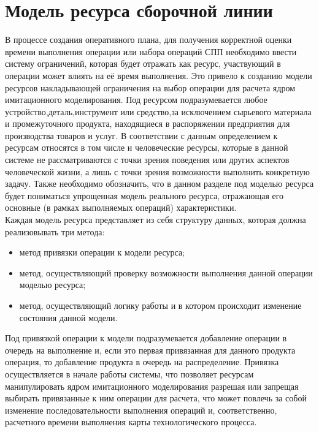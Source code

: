 \section{Модель ресурса сборочной линии}
\indent В процессе создания оперативного плана, для получения корректной оценки времени выполнения операции или набора операций СПП необходимо ввести систему ограничений, которая будет отражать как ресурс, участвующий в операции может влиять на её время выполнения.
Это привело к созданию модели ресурсов накладывающей ограничения на выбор операции для расчета ядром имитационного моделирования.
Под ресурсом подразумевается любое устройство,деталь,инструмент или средство,за исключением сырьевого материала и промежуточного продукта, находящиеся в распоряжении предприятия для производства товаров и услуг.
В соответствии с данным определением к ресурсам относятся в том числе и человеческие ресурсы, которые в данной системе не рассматриваются с точки зрения поведения или других аспектов человеческой жизни, а лишь с точки зрения возможности выполнить конкретную задачу.
Также необходимо обозначить, что в данном разделе под моделью ресурса будет пониматься упрощенная модель реального ресурса, отражающая его основные (в рамках выполняемых операций) характеристики.\\
\indent Каждая модель ресурса представляет из себя структуру данных, которая должна реализовывать три метода:
\begin{itemize}
	\item метод привязки операции к модели ресурса;
	\item метод, осуществляющий проверку возможности выполнения данной операции моделью ресурса;
	\item метод, осуществляющий логику работы и в котором происходит изменение состояния данной модели.
\end{itemize}

\indent Под привязкой операции к модели подразумевается добавление операции в очередь на выполнение и, если это первая привязанная для данного продукта операция, то добавление продукта в очередь на распределение. Привязка осуществляется в начале работы системы, что позволяет ресурсам манипулировать ядром имитационного моделирования разрешая или запрещая выбирать привязанные к ним операции для расчета, что может повлечь за собой изменение последовательности выполнения операций и, соответственно, расчетного времени выполнения карты технологического процесса.

